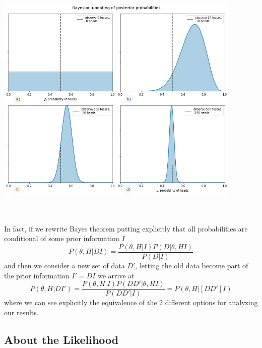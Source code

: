 \documentclass[onecolumn,           %
               showpacs,            %
               preprintnumbers,     %
               aps,                 %
               prl,          	    %
               letterpaper,             %
               superscriptaddress,      %
               nofootinbib,         %
               tightenlines,        %
               floats,floatfix      %
               ,usenatbib,
               ]{revtex4-1}
\begin{document}
\begin{minipage}{\textwidth}
\centering
\includegraphics[height=10cm]{coin1.png}
\label{coin1}
\end{minipage}
\\$ $ \\

In fact, if we rewrite Bayes theorem putting explicitly that all probabilities are conditional of some prior information $I$
\begin{equation}\label{BayesTI}
P(\theta,H|DI)=\frac{P(\theta,H|I)P(D|\theta,HI)}{P(D|I)}
\end{equation}
and then we consider a new set of data $D'$, letting the old data become part of the prior information $I'=DI$ we arrive at \cite{AlanH}   
\begin{equation}
P(\theta,H|DI')=\frac{P(\theta,H|I)P(DD'|\theta,HI)}{P(DD'|I)}=P(\theta,H|[DD']I)
\end{equation}
where we can see explicitly the equivalence of the 2 different options for analyzing our results. 
\subsection{About the Likelihood}
\end{document}

